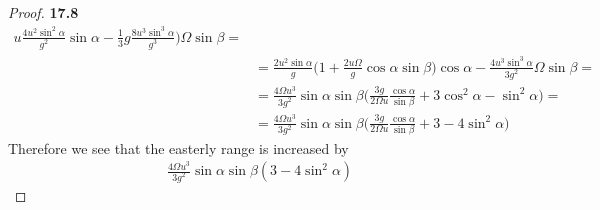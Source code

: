 \documentclass[11pt]{article}
\theoremstyle{definition}
\begin{document}
\begin{proof}{\textbf{17.8}}
\begin{align*}
            u\frac{4u^2\sin^2\alpha}{g^2}\sin\alpha
            - \frac{1}{3}g\frac{8u^3\sin^3\alpha}{g^3}
        \bigg)\Omega\sin\beta =\\
        &= \frac{2u^2\sin\alpha}{g}
        \bigg(1 + \frac{2u\Omega}{g}\cos\alpha\sin\beta\bigg)
        \cos\alpha
        - \frac{4u^3\sin^3\alpha}{3g^2}\Omega\sin\beta =\\
        &= \frac{4\Omega u^3}{3g^2}\sin\alpha\sin\beta\bigg(
            \frac{3g}{2\Omega u}\frac{\cos\alpha}{\sin\beta}
            + 3\cos^2\alpha - \sin^2\alpha\bigg)=\\
        &= \frac{4\Omega u^3}{3g^2}\sin\alpha\sin\beta\bigg(
            \frac{3g}{2\Omega u}\frac{\cos\alpha}{\sin\beta}
            + 3 - 4\sin^2\alpha\bigg)
    \end{align*}
    Therefore we see that the easterly range is increased by
    \begin{align*}
        \frac{4\Omega u^3}{3g^2}\sin\alpha\sin\beta
        (3 - 4\sin^2\alpha)
    \end{align*} 
\end{proof}
\cleardoublepage
\end{document}
